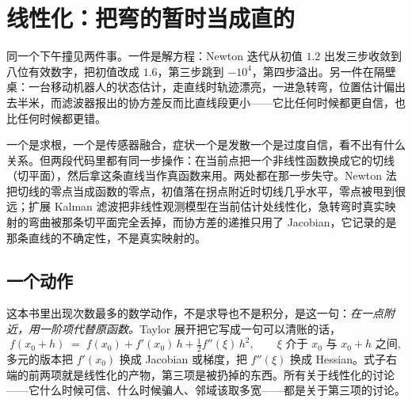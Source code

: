 \section{线性化：把弯的暂时当成直的}
\label{sec:17-Synthesis/02-Recurring-Ideas/01}

同一个下午撞见两件事。一件是解方程：Newton 迭代从初值 \(1.2\) 出发三步收敛到八位有效数字，把初值改成 \(1.6\)，第三步跳到 \(-10^{4}\)，第四步溢出。另一件在隔壁桌：一台移动机器人的状态估计，走直线时轨迹漂亮，一进急转弯，位置估计偏出去半米，而滤波器报出的协方差反而比直线段更小——它比任何时候都更自信，也比任何时候都更错。

一个是求根，一个是传感器融合，症状一个是发散一个是过度自信，看不出有什么关系。但两段代码里都有同一步操作：在当前点把一个非线性函数换成它的切线（切平面），然后拿这条直线当作真函数来用。两处都在那一步失守。Newton 法把切线的零点当成函数的零点，初值落在拐点附近时切线几乎水平，零点被甩到很远；扩展 Kalman 滤波把非线性观测模型在当前估计处线性化，急转弯时真实映射的弯曲被那条切平面完全丢掉，而协方差的递推只用了 Jacobian，它记录的是那条直线的不确定性，不是真实映射的。

\subsection{一个动作}

这本书里出现次数最多的数学动作，不是求导也不是积分，是这一句：\emph{在一点附近，用一阶项代替原函数。}Taylor 展开把它写成一句可以清账的话，
\[
  f(x_0+h) \;=\; f(x_0) + f'(x_0)\,h + \tfrac{1}{2} f''(\xi)\,h^{2},
  \qquad \xi \text{ 介于 } x_0 \text{ 与 } x_0+h \text{ 之间},
\]
多元的版本把 \(f'(x_0)\) 换成 Jacobian 或梯度，把 \(f''(\xi)\) 换成 Hessian。式子右端的前两项就是线性化的产物，第三项是被扔掉的东西。所有关于线性化的讨论——它什么时候可信、什么时候骗人、邻域该取多宽——都是关于第三项的讨论。

